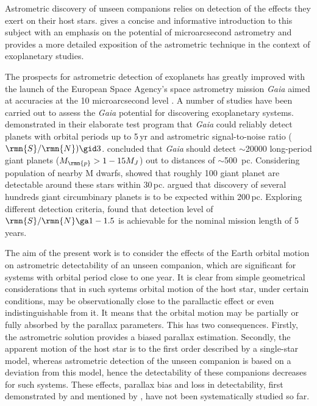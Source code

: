 \documentclass[fleqn,usenatbib,useAMS,usedcolumn]{mnras}
\begin{document}
Astrometric discovery of unseen companions relies on detection of the effects they exert on their host stars. \citet{sozzetti2013} gives a concise and informative introduction to this subject with an emphasis on the potential of microarcsecond astrometry and \cite{Perryman2011} provides a more detailed exposition of the astrometric technique in the context of exoplanetary studies.

The prospects for astrometric detection of exoplanets has greatly improved with the launch of the European Space Agency's space astrometry mission \emph{Gaia} aimed at accuracies at the 10 microarcsecond level \citep{Gaia-Collaboration2016}. A number of studies have been carried out to assess the \emph{Gaia} potential for discovering exoplanetary systems. \cite{Casertano+2008} demonstrated in their elaborate test program that \emph{Gaia} could reliably detect planets with orbital periods up to 5\,yr and astrometric signal-to-noise ratio ($\rmn{S}/\rmn{N})\gid3$. \cite{Perryman+2014} concluded that \emph{Gaia} should detect $\sim$20000 long-period giant planets ($M_\rmn{p}>1-15M_J$) out to distances of $\sim$500~pc. Considering population of nearby M dwarfs, \cite{Sozzetti+2014} showed that roughly 100 giant planet are detectable around these stars within 30\,pc. \cite{Sahlmann+2015} argued that discovery of several hundreds giant circumbinary planets is to be expected within 200\,pc. Exploring different detection criteria, \cite{2017arXiv1704.02493} found that detection level of $\rmn{S}/\rmn{N}\ga1-1.5$  is achievable for the nominal mission length of 5 years.

The aim of the present work is to consider the effects of the Earth orbital motion on astrometric detectability of an unseen companion, which are significant for systems with orbital period close to one year. It is clear from simple geometrical considerations that in such systems orbital motion of the host star, under certain conditions, may be observationally close to the parallactic effect or even indistinguishable from it. It means that the orbital motion may be partially or fully absorbed by the parallax parameters. This has two consequences. Firstly, the astrometric solution provides a biased parallax estimation. Secondly, the apparent motion of the host star is to the first order described by a single-star model, whereas astrometric detection of the unseen companion is based on a deviation from this model, hence the detectability of these companions decreases for such systems. These effects, parallax bias and loss in detectability, first demonstrated by \cite{Holl2011} and mentioned by \cite{Perryman+2014}, have not been systematically studied so far.
\end{document}
